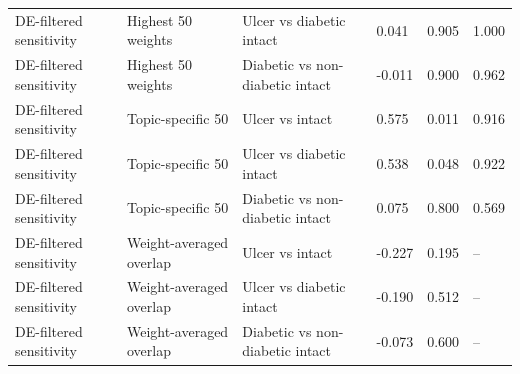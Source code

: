 {\begin{longtable}{@{}p{32mm}p{36mm}p{42mm}p{22mm}p{18mm}p{18mm}@{}}
DE-filtered sensitivity & Highest 50 weights & Ulcer vs diabetic intact & 0.041 & 0.905 & 1.000\\
DE-filtered sensitivity & Highest 50 weights & Diabetic vs non-diabetic intact & -0.011 & 0.900 & 0.962\\
DE-filtered sensitivity & Topic-specific 50 & Ulcer vs intact & 0.575 & 0.011 & 0.916\\
DE-filtered sensitivity & Topic-specific 50 & Ulcer vs diabetic intact & 0.538 & 0.048 & 0.922\\
DE-filtered sensitivity & Topic-specific 50 & Diabetic vs non-diabetic intact & 0.075 & 0.800 & 0.569\\
DE-filtered sensitivity & Weight-averaged overlap & Ulcer vs intact & -0.227 & 0.195 & --\\
DE-filtered sensitivity & Weight-averaged overlap & Ulcer vs diabetic intact & -0.190 & 0.512 & --\\
DE-filtered sensitivity & Weight-averaged overlap & Diabetic vs non-diabetic intact & -0.073 & 0.600 & --\\
\end{longtable}
}
